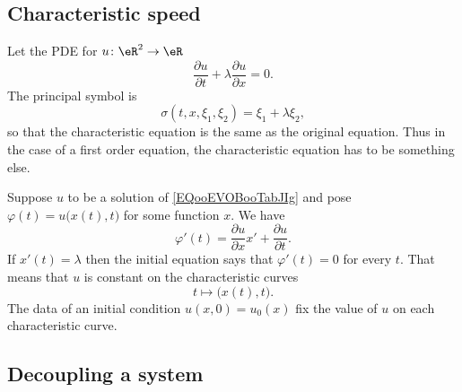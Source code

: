 \subsection{Characteristic speed}

Let the PDE for \( u\colon \eR^2\to \eR\)
\begin{equation}        \label{EQooEVOBooTabJIg}
    \frac{ \partial u }{ \partial t }+\lambda\frac{ \partial u }{ \partial x }=0.
\end{equation}
The principal symbol is
\begin{equation}
    \sigma(t,x,\xi_1,\xi_2)=\xi_1+\lambda \xi_2,
\end{equation}
so that the characteristic equation is the same as the original equation. Thus in the case of a first order equation, the characteristic equation has to be something else.

Suppose \( u\) to be a solution of \eqref{EQooEVOBooTabJIg} and pose \( \varphi(t)=u\big( x(t),t \big)\) for some function \( x\). We have
\begin{equation}
    \varphi'(t)=\frac{ \partial u }{ \partial x }x'+\frac{ \partial u }{ \partial t }.
\end{equation}
If \( x'(t)=\lambda\) then the initial equation says that \( \varphi'(t)=0\) for every \( t\). That means that \( u\) is constant on the characteristic curves
\begin{equation}
    t\mapsto \big( x(t),t \big).
\end{equation}
The data of an initial condition \( u(x,0)=u_0(x)\) fix the value of \( u\) on each characteristic curve.

\subsection{Decoupling a system}

